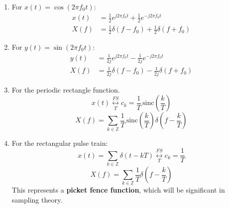 \begin{example}
    \begin{enumerate}
        \item For \( x(t) = \cos(2 \pi f_0 t) \):
           \begin{align*}
               x(t) &= \frac{1}{2} e^{j 2 \pi f_0 t} + \frac{1}{2} e^{-j 2 \pi f_0 t} \\
               X(f) &= \frac{1}{2} \delta(f - f_0) + \frac{1}{2} \delta(f + f_0)
           \end{align*}
        
        \item For \( y(t) = \sin(2 \pi f_0 t) \):
           \begin{align*}
               y(t) &= \frac{1}{2j} e^{j 2 \pi f_0 t} - \frac{1}{2j} e^{-j 2 \pi f_0 t} \\
               X(f) &= \frac{1}{2j} \delta(f - f_0) - \frac{1}{2j} \delta(f + f_0)
           \end{align*}
        
        \item For the periodic rectangle function.
        \[
        x(t) \underset{T}{\overset{FS}{\longleftrightarrow}} c_k = \frac{1}{T} \, \text{sinc} \left( \frac{k}{T} \right)
        \]
        \[
        X(f) = \sum_{k \in \mathbb{Z}} \frac{1}{T} \, \text{sinc} \left( \frac{k}{T} \right) \delta \left( f - \frac{k}{T} \right)
        \]

        \item For the rectangular pulse train:
           \[
           x(t) = \sum_{k \in \mathbb{Z}} \delta(t - kT) \underset{T}{\overset{FS}{\longleftrightarrow}} c_k = \frac{1}{T}
           \]
           \[
           X(f) = \sum_{k \in \mathbb{Z}} \frac{1}{T} \delta\left(f - \frac{k}{T}\right)
           \]
           This represents a \textbf{picket fence function}, which will be significant in sampling theory.
    \end{enumerate}
\end{example}
